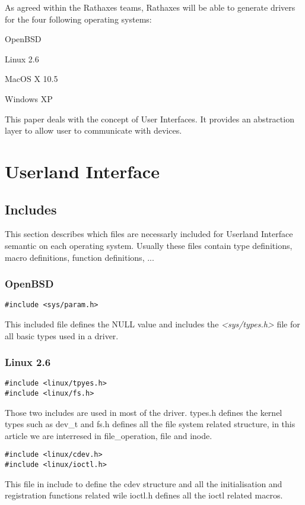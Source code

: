 \documentclass[11pt]{report}
\begin{document}
As agreed within the Rathaxes teams, Rathaxes will be able to generate drivers
for the four following operating systems:
\begin{description}
    \item{OpenBSD}
    \item{Linux 2.6}
    \item{MacOS X 10.5}
    \item{Windows XP}
\end{description}

This paper deals with the concept of User Interfaces. It provides
an abstraction layer to allow user to communicate with devices.

\tableofcontents

\chapter{Userland Interface}

\section{Includes}
This section describes which files are necessarly included for Userland Interface semantic
on each operating system.
Usually these files contain type definitions, macro definitions, function definitions, ...

\subsection{OpenBSD}

\begin{lstlisting}
#include <sys/param.h>
\end{lstlisting}
This included file defines the NULL value and includes the {\it \textless sys/types.h\textgreater} file for all
basic types used in a driver.

\subsection{Linux 2.6}

\begin{lstlisting}
#include <linux/tpyes.h>
#include <linux/fs.h>
\end{lstlisting}
Those two includes are used in most of the driver. types.h defines the kernel types such as dev\_t and fs.h defines all the file system related structure, in this article we are interresed in file\_operation, file and inode.
\begin{lstlisting}
#include <linux/cdev.h>
#include <linux/ioctl.h>
\end{lstlisting}
This file in include to define the cdev structure and all the initialisation and registration functions related wile ioctl.h defines all the ioctl related macros.
\end{document}
